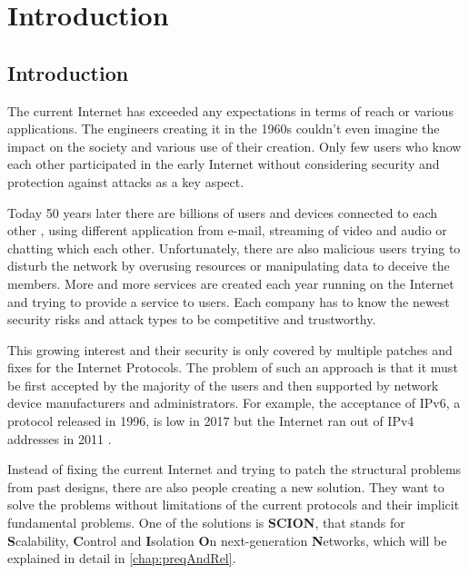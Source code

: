 \documentclass[thesis.tex]{subfiles}
\begin{document}
\chapter{Introduction}
\label{chap:introduction}


\section{Introduction}
The current Internet has exceeded any expectations in terms of reach or various applications. The engineers creating it in the 1960s couldn't even imagine the impact on the society and various use of their creation. Only few users who know each other participated in the early Internet without considering security and protection against attacks as a key aspect.

Today 50 years later there are billions of users and devices connected to each other \cite{MiniwattsMarketingGroup.31.12.2017}, using different application from e-mail, streaming of video and audio or chatting which each other. Unfortunately, there are also malicious users trying to disturb the network by overusing resources or manipulating data to deceive the members. More and more services are created each year running on the Internet and trying to provide a service to users. Each company has to know the newest security risks and attack types to be competitive and trustworthy. 

This growing interest and their security is only covered by multiple patches and fixes for the Internet Protocols. The problem of such an approach is that it must be first accepted by the majority of the users and then supported by network device manufacturers and administrators. For example, the acceptance of IPv6, a protocol released in 1996, is low in 2017 but the Internet ran out of IPv4 addresses in 2011 \cite{ICANN.03.02.2011}.

Instead of fixing the current Internet and trying to patch the structural problems from past designs, there are also people creating a new solution. They want to solve the problems without limitations of the current protocols and their implicit fundamental problems. One of the solutions is \textbf{SCION}\cite{SCIONBook, SCIONPaper}, that stands for \textbf{S}calability, \textbf{C}ontrol and \textbf{I}solation \textbf{O}n next-generation \textbf{N}etworks, which will be explained in detail in \autoref{chap:preqAndRel}.
\end{document}
